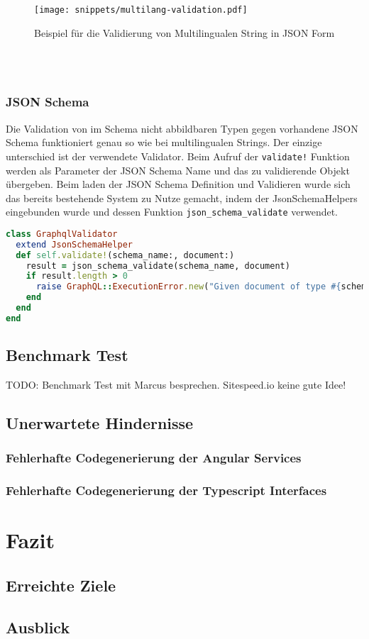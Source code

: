 \begin{figure}[h!]
    \centering
    \texttt{[image: snippets/multilang-validation.pdf]}
    \caption{Beispiel für die Validierung von Multilingualen String in JSON Form}
    \label{req:typesafe:example}
\end{figure}

\ \\
\ \\

\subsection{JSON Schema}
Die Validation von im Schema nicht abbildbaren Typen gegen vorhandene JSON Schema funktioniert genau so wie bei multilingualen Strings. Der einzige unterschied ist der verwendete Validator. Beim Aufruf der \lstinline|validate!| Funktion werden als Parameter der JSON Schema Name und das zu validierende Objekt übergeben. Beim laden der JSON Schema Definition und Validieren wurde sich das bereits bestehende System zu Nutze gemacht, indem der JsonSchemaHelpers eingebunden wurde und dessen Funktion \lstinline|json_schema_validate| verwendet. 

\begin{lstlisting}[language=Ruby,float=h!,caption={Validator Klasse zum Prüfen, ob der übergebene Parameter die Beschaffenheit des JSON Schema aufweist. \lstinline|/graphql/validators/graphql_validator.rb|}, label={lst:jsonschema-validation}]
class GraphqlValidator
  extend JsonSchemaHelper
  def self.validate!(schema_name:, document:)
    result = json_schema_validate(schema_name, document)
    if result.length > 0
      raise GraphQL::ExecutionError.new("Given document of type #{schema_name} does not match the schema[...]", extensions: { code: 'VALIDATION' })
    end
  end
end
\end{lstlisting}


\section{Benchmark Test}
TODO: Benchmark Test mit Marcus besprechen. Sitespeed.io keine gute Idee!
\section{Unerwartete Hindernisse}
\subsection{Fehlerhafte Codegenerierung der Angular Services}
\subsection{Fehlerhafte Codegenerierung der Typescript Interfaces}

\chapter{Fazit}
\section{Erreichte Ziele}
\section{Ausblick}
